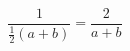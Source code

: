 \documentclass[nofonts]{ctexart}
\begin{document}
\[
	\frac{1}{\frac{1}{2}(a+b)} = \frac{2}{a+b}
\]
\end{document}
